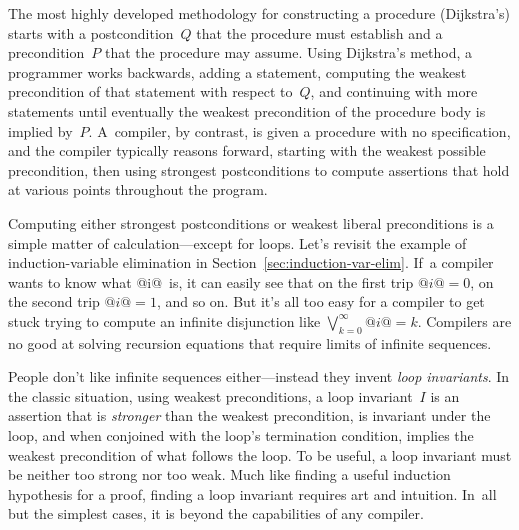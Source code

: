 \documentclass[blockstyle,preprint,nocopyrightspace]{sigplanconf}
\newcommand\secref[1]{Section~\ref{sec:#1}}
\newcommand\seclabel[1]{\label{sec:#1}}
\begin{document}

\seclabel{logic}




The most highly developed
methodology for constructing a procedure (Dijkstra's) starts with a
postcondition~$Q$ that the procedure must establish and a
precondition~$P$ that the procedure may assume.
Using Dijkstra's method, a programmer 
works backwards, adding a statement, computing the weakest
precondition of that statement with respect to~$Q$,
and continuing with more statements until
eventually the weakest precondition of the procedure body is implied by~$P$.
A~compiler, by contrast, is given a procedure with no specification,
and the compiler typically reasons forward,  starting with the
weakest possible precondition, then using strongest postconditions to
compute assertions that hold at various points throughout the program.


Computing either strongest postconditions or weakest liberal
preconditions is a simple matter of calculation---except for loops.
Let's revisit the example of induction-variable elimination in
\secref{induction-var-elim}. 
If~a compiler wants to know what @i@~is, it can easily see that on the
first trip $@i@=0$, on the second trip $@i@=1$, and so on.
But it's all too easy for a compiler to get stuck trying to compute an
infinite disjunction like $\bigvee_{k=0}^{\infty} @i@=k$.
Compilers are no good at solving recursion
equations that require limits of infinite sequences.

People don't like infinite sequences either---instead they invent
\emph{loop invariants}. 
In the classic situation, using weakest preconditions, a loop
invariant~$I$ is an assertion that is \emph{stronger} than the weakest
precondition, is invariant under the loop, and when conjoined with
the loop's termination condition, implies the weakest precondition of
what follows the loop.
To be useful, a loop invariant must be neither too strong nor too
weak.
Much like finding a useful induction hypothesis for a proof, 
finding a loop invariant requires art and intuition.
In~all but the simplest cases, it is beyond the capabilities of any
compiler.
\end{document}
